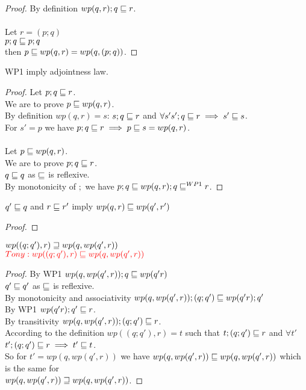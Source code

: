 \documentclass{article}
\begin{document}
\begin{proof}
By definition $wp(q, r); q \sqsubseteq r$.\\
\\
Let $r = (p; q)$\\
$p; q \sqsubseteq p; q$\\
then $p \sqsubseteq wp(q, r) = wp(q, (p; q))$.
\end{proof}

\begin{theorem}
WP1 imply adjointness law.
\end{theorem}

\begin{proof}
Let $p; q \sqsubseteq r$.\\
We are to prove $p \sqsubseteq wp(q, r)$.\\
By definition $wp(q, r) = s$: $s; q \sqsubseteq r$ and $\forall s' s'; q \sqsubseteq r \implies s' \sqsubseteq s$.\\
For $s' = p$ we have $p; q \sqsubseteq r \implies p \sqsubseteq s = wp(q, r)$.\\
\\
Let $p \sqsubseteq wp(q, r)$.\\
We are to prove $p; q \sqsubseteq r$.\\
$q \sqsubseteq q$ as $\sqsubseteq$ is reflexive.\\
By monotonicity of $;$ we have $p; q \sqsubseteq wp(q, r); q \sqsubseteq^{WP1} r$.
\end{proof}


\begin{theorem}[wp monotonicity]
$q' \sqsubseteq q$ and $r \sqsubseteq r'$ imply $wp(q, r) \sqsubseteq wp(q', r')$
\end{theorem}

\begin{proof}
\end{proof}

\begin{theorem}[Stepwise wp]
$wp((q; q'), r) \sqsupseteq wp(q, wp(q', r))$\\
$\color{red} Tony: wp((q; q'), r) \sqsubseteq wp(q, wp(q', r))$
\end{theorem}

\begin{proof}
By WP1 $wp(q, wp(q', r)); q \sqsubseteq wp(q' r)$\\
$q' \sqsubseteq q'$ as $\sqsubseteq$ is reflexive.\\
By monotonicity and associativity $wp(q, wp(q', r)); (q; q') \sqsubseteq wp(q' r); q'$\\
By WP1 $wp(q' r); q' \sqsubseteq r$.\\
By transitivity $wp(q, wp(q', r)); (q; q') \sqsubseteq r$.\\
According to the definition $wp((q; q'), r) = t$ such that $t; (q; q') \sqsubseteq r$ and $\forall t'$ $t'; (q; q') \sqsubseteq r \implies t' \sqsubseteq t$.\\
So for $t' = wp(q, wp(q', r))$ we have $wp(q, wp(q', r)) \sqsubseteq wp(q, wp(q', r))$ which is the same for\\
$wp(q, wp(q', r)) \sqsupseteq wp(q, wp(q', r))$.
\end{proof}
\end{document}
